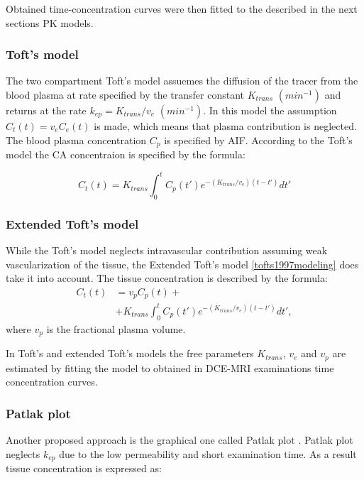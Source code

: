 Obtained time-concentration curves were then fitted to the described in the next sections PK models.



\subsubsection{Toft's model}
The two compartment Toft's model \cite{tofts1991measurement} assuemes the diffusion of the tracer from the blood plasma at rate specified by the transfer constant $K_{trans}$ $(min^{-1})$ and returns at the rate $k_{ep} = K_{trans}/v_e$ $(min^{-1})$. In this model the assumption $C_t(t) = v_eC_e(t)$ is made, which means that plasma contribution is neglected. The blood plasma concentration $C_p$ is specified by AIF. According to the Toft's model the CA concentraion is specified by the formula:
 
\begin{equation}
	\label{eq:toft}
	C_{t}(t) = K_{trans}\int_{0}^{t}C_p(t')e^{-(K_{trans}/v_e)(t-t')}dt'  
\end{equation}

\subsubsection{Extended Toft's model}
While the Toft's model neglects intravascular contribution assuming weak vascularization of the tissue, the Extended Toft's model \ref{tofts1997modeling} does take it into account. The tissue concentration is described by the formula:
\begin{align}
	\label{eq:extended_toft}
	\nonumber C_{t}(t) &= v_pC_p(t)+\\ 
	&+ K_{trans}\int_{0}^{t}C_p(t')e^{-(K_{trans}/v_e)(t-t')}dt', 
\end{align}
where $v_p$ is the fractional plasma volume. 

In Toft's and extended Toft's models the free parameters $K_{trans}$, $v_e$ and $v_p$ are estimated by fitting the model to obtained in DCE-MRI examinations time concentration curves.  

\subsubsection{Patlak plot}
Another proposed approach is the graphical one called Patlak plot \cite{patlak1983graphical}. Patlak plot neglects $k_{ep}$ due to the low permeability and short examination time. As a result tissue concentration is expressed as:

